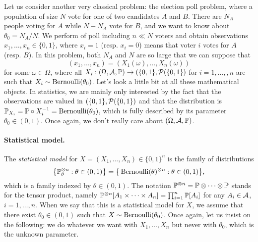 Let us consider another very classical problem: the election poll problem, where a population of size $N$ vote for one of two candidates $A$ and $B$.
There are $N_A$ people voting for $A$ while $N - N_A$ vote for $B$, and we want to know about $\theta_0 = N_A / N$.
We perform of poll including $n \ll N$ voters and obtain observations $x_1, \ldots, x_n \in \{ 0, 1 \}$, where $x_i = 1$ (resp. $x_i = 0$) means that voter $i$ votes for $A$ (resp. $B$).
In this problem, both $N_A$ and $N$ are so large that we can suppose that
\begin{equation*} 
	(x_1, \ldots, x_n) = (X_1(\omega), \ldots, X_n(\omega))
\end{equation*}
for some $\omega \in \Omega$, where all $X_i : (\Omega, \cA, \P) \rightarrow (\{0, 1\}, \cP(\{ 0, 1\})$
for $i=1, \ldots,, n$ are such that $X_i \sim \ber(\theta_0)$.
Let's look a little bit at all these mathematical objects. 
In statistics, we are mainly only interested by the fact that the observations are valued in $(\{0, 1\}, \cP(\{ 0, 1\})$ and that the distribution is $\P_{X_i} = \P \circ X_i^{-1} = \ber(\theta_0)$, which is fully described by its parameter $\theta_0 \in (0, 1)$.
Once again, we don't really care about $(\Omega, \cA, \P)$.

\paragraph{Statistical model.}

The \emph{statistical model} for $X = (X_1, \ldots, X_n) \in \{0, 1\}^n$ is the family of distributions
\begin{equation*}
	\big\{ \P_\theta^{\otimes n} : \theta \in (0, 1) \big\}	= \big\{ \ber(\theta)^{\otimes n} : \theta \in (0, 1) \big\},
\end{equation*}
which is a family indexed by $\theta \in (0, 1)$.
The notation $\P^{\otimes n} = \P \otimes \cdots \otimes \P$ stands for the tensor product, namely $\P^{\otimes n}[A_1 \times \cdots \times A_n] = \prod_{i=1}^n \P[A_i]$ for any $A_i \in \cA$, $i=1, \ldots, n$.%
When we say that this is a statistical model for $X$, we assume that there exist $\theta_0 \in (0, 1)$ such that $X \sim \ber(\theta_0)$.
Once again, let us insist on the following: we do whatever we want with $X_1, \ldots, X_n$ but never with $\theta_0$, which is the unknown parameter.

